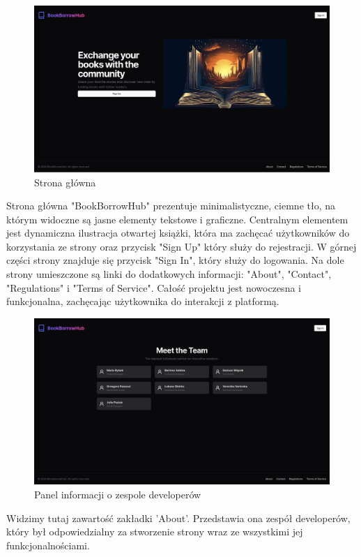 \documentclass[12pt]{article}
\begin{document}
\begin{figure}[h!]
	\centering
	\includegraphics[width=17.5cm]{figures/Obraz5.png}
	\caption{Strona główna}
\end{figure}
Strona główna "BookBorrowHub" prezentuje minimalistyczne, 
ciemne tło, na którym widoczne są jasne elementy tekstowe 
i graficzne. Centralnym elementem jest dynamiczna ilustracja otwartej książki, 
która ma zachęcać użytkowników do korzystania ze strony oraz przycisk "Sign Up" który służy do rejestracji.
W górnej części strony znajduje się przycisk "Sign In", który służy do logowania. 
Na dole strony umieszczone są linki do dodatkowych informacji: "About", "Contact", 
"Regulations" i "Terms of Service". 
Całość projektu jest nowoczesna i funkcjonalna, zachęcając użytkownika do interakcji z platformą.


\newpage
\begin{figure}[h!]
	\centering
	\includegraphics[width=17.5cm]{figures/Obraz6.png}
	\caption{Panel informacji o zespole developerów} 
\end{figure}
Widzimy tutaj zawartość zakładki 'About'. 
Przedstawia ona zespół developerów, 
który był odpowiedzialny za stworzenie strony wraz ze wszystkimi jej funkcjonalnościami.
\end{document}
